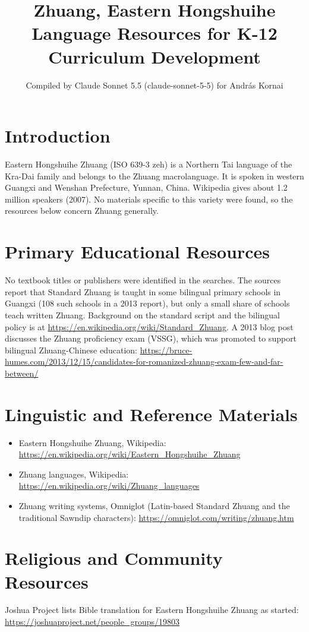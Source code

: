 \documentclass[12pt]{article}
\title{Zhuang, Eastern Hongshuihe Language Resources for K-12 Curriculum Development}
\author{Compiled by Claude Sonnet 5.5 (claude-sonnet-5-5) for Andr\'as Kornai}
\date{}
\begin{document}
\maketitle

\section{Introduction}
Eastern Hongshuihe Zhuang (ISO 639-3 zeh) is a Northern Tai language of the Kra-Dai family and belongs to the Zhuang macrolanguage. It is spoken in western Guangxi and Wenshan Prefecture, Yunnan, China. Wikipedia gives about 1.2 million speakers (2007). No materials specific to this variety were found, so the resources below concern Zhuang generally.

\section{Primary Educational Resources}
No textbook titles or publishers were identified in the searches. The sources report that Standard Zhuang is taught in some bilingual primary schools in Guangxi (108 such schools in a 2013 report), but only a small share of schools teach written Zhuang. Background on the standard script and the bilingual policy is at \url{https://en.wikipedia.org/wiki/Standard_Zhuang}. A 2013 blog post discusses the Zhuang proficiency exam (VSSG), which was promoted to support bilingual Zhuang-Chinese education: \url{https://bruce-humes.com/2013/12/15/candidates-for-romanized-zhuang-exam-few-and-far-between/}

\section{Linguistic and Reference Materials}
\begin{itemize}
\item Eastern Hongshuihe Zhuang, Wikipedia: \url{https://en.wikipedia.org/wiki/Eastern_Hongshuihe_Zhuang}
\item Zhuang languages, Wikipedia: \url{https://en.wikipedia.org/wiki/Zhuang_languages}
\item Zhuang writing systems, Omniglot (Latin-based Standard Zhuang and the traditional Sawndip characters): \url{https://omniglot.com/writing/zhuang.htm}
\end{itemize}

\section{Religious and Community Resources}
Joshua Project lists Bible translation for Eastern Hongshuihe Zhuang as started: \url{https://joshuaproject.net/people_groups/19803}
\end{document}
